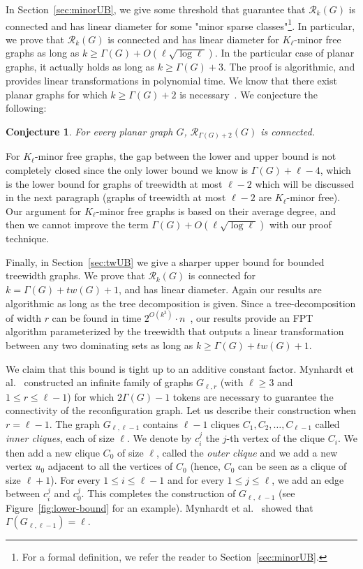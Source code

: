 \documentclass[10pt]{article}
\newtheorem{conjecture}{Conjecture}
\begin{document}
In Section~\ref{sec:minorUB}, we give some threshold that guarantee that $\mathcal{R}_k(G)$ is connected and has linear diameter for some "minor sparse classes"\footnote{For a formal definition, we refer the reader to Section~\ref{sec:minorUB}.}. In particular, we prove that $\mathcal{R}_k(G)$ is connected and has linear diameter for $K_{\ell}$-minor free graphs as long as $k \ge \Gamma(G)+O(\ell \sqrt{\log \ell})$. In the particular case of planar graphs, it actually holds as long as $k \ge \Gamma(G)+3$. The proof is algorithmic, and provides linear transformations in polynomial time. We know that there exist planar graphs for which $k \ge \Gamma(G)+2$ is necessary~\cite{SuzukiMN16}. We conjecture the following:

\begin{conjecture}\label{conjecture-planar}
For every planar graph $G$, $\mathcal{R}_{\Gamma(G)+2}(G)$ is connected.
\end{conjecture}

For $K_\ell$-minor free graphs, the gap between the lower and upper bound is not completely closed since the only lower bound we know is $\Gamma(G)+\ell-4$, which is the lower bound for graphs of treewidth at most $\ell-2$ which will be discussed in the next paragraph (graphs of treewidth at most $\ell-2$ are $K_\ell$-minor free). Our argument for  $K_\ell$-minor free graphs is based on their average degree, and then we cannot improve the term $\Gamma(G)+O(\ell \sqrt{\log \ell})$ with our proof technique.

Finally, in Section~\ref{sec:twUB} we give a sharper upper bound for bounded treewidth graphs. We prove that $\mathcal{R}_k(G)$ is connected for $k=\Gamma(G)+tw(G)+1$, and has linear diameter. Again our results are algorithmic as long as the tree decomposition is given. Since a tree-decomposition of width $r$ can be found in time $2^{O(k^3)} \cdot n$~\cite{Bodlaender96}, our results provide an FPT algorithm parameterized by the treewidth that outputs a linear transformation between any two dominating sets as long as $k \ge \Gamma(G)+tw(G)+1$. 

We claim that this bound is tight up to an additive constant factor. Mynhardt et al.~\cite{Mynhardt19} constructed an infinite family of graphs $G_{\ell,r}$ (with $\ell \ge 3$ and $1 \le r \le \ell-1$) for which $2\Gamma(G)-1$ tokens are necessary to guarantee the connectivity of the reconfiguration graph. Let us describe their construction when $r=\ell-1$. The graph $G_{\ell, \ell-1}$ contains $\ell-1$ cliques $C_1,C_2, \ldots, C_{\ell-1}$ called {\em inner cliques}, each of size $\ell$. We denote by $c^j_i$ the $j$-th vertex of the clique $C_i$. We then add a new clique $C_0$ of size $\ell$, called the {\em outer clique} and we add a new vertex $u_0$ adjacent to all the vertices of $C_0$ (hence, $C_0$ can be seen as a clique of size $\ell+1$). For every $1 \le i \le \ell-1$ and for every $1 \le j \le \ell$, we add an edge between $c^j_i$ and $c^j_0$. This completes the construction of $G_{\ell,\ell-1}$ (see Figure~\ref{fig:lower-bound} for an example). Mynhardt et al.~\cite{Mynhardt19} showed that $\Gamma(G_{\ell,\ell-1})=\ell$.  
\end{document}
